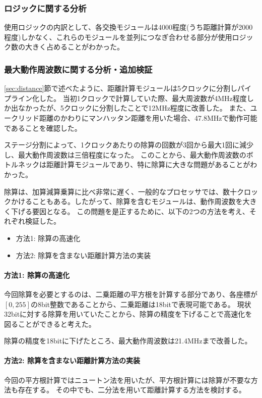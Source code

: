 \subsubsection*{ロジックに関する分析}
使用ロジックの内訳として、各交換モジュールは4000程度(うち距離計算が2000程度)しかなく、これらのモジュールを並列につなぎ合わせる部分が使用ロジック数の大きく占めることがわかった。

\subsubsection*{最大動作周波数に関する分析・追加検証}
\ref{sec:distance}節で述べたように、距離計算モジュールは5クロックに分割しパイプライン化した。
当初1クロックで計算していた際、最大周波数が4MHz程度しか出なかったが、5クロックに分割したことで12MHz程度に改善した。
また、ユークリッド距離のかわりにマンハッタン距離を用いた場合、47.8MHzで動作可能であることを確認した。

ステージ分割によって、1クロックあたりの除算の回数が3回から最大1回に減少し、最大動作周波数は三倍程度になった。
このことから、最大動作周波数のボトルネックは距離計算モジュールであり、特に除算に大きな問題があることがわかった。

除算は、加算減算乗算に比べ非常に遅く、一般的なプロセッサでは、数十クロックかけることもある。したがって、除算を含むモジュールは、動作周波数を大きく下げる要因となる。
この問題を是正するために、以下の2つの方法を考え、それぞれ検証した。
\begin{itemize}
    \item 方法1: 除算の高速化
    \item 方法2: 除算を含まない距離計算方法の実装
\end{itemize}
\paragraph*{方法1: 除算の高速化}
今回除算を必要とするのは、二乗距離の平方根を計算する部分であり、各座標が$[0,255]$の8bit整数であることから、二乗距離は18bitで表現可能である。
現状32bitに対する除算を用いていたことから、除算の精度を下げることで高速化を図ることができると考えた。

除算の精度を18bitに下げたところ、最大動作周波数は21.4MHzまで改善した。

\paragraph*{方法2: 除算を含まない距離計算方法の実装}
今回の平方根計算ではニュートン法を用いたが、平方根計算には除算が不要な方法も存在する。
その中でも、二分法を用いて距離計算する方法を検討する。

